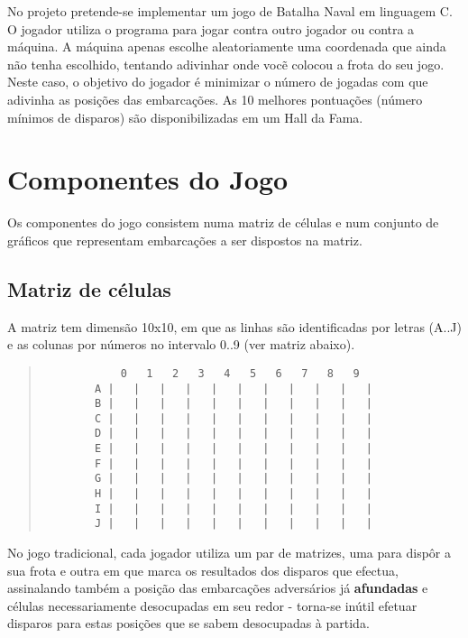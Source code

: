 \documentclass[defesa,oneside]{ppginf}
\begin{document}
No projeto pretende-se implementar um jogo de Batalha Naval em linguagem C. O jogador utiliza o programa para jogar contra outro jogador ou contra a máquina. A máquina apenas escolhe aleatoriamente uma coordenada que ainda não tenha escolhido, tentando adivinhar onde vocẽ colocou a frota do seu jogo. Neste caso, o objetivo do jogador é minimizar o número de jogadas com que adivinha as posições das embarcações. As 10 melhores pontuações (número mínimos de disparos) são disponibilizadas em um Hall da Fama.


\chapter{Componentes do Jogo}

Os componentes do jogo consistem numa matriz de células e num conjunto de gráficos que representam embarcações a ser dispostos na matriz.

\section{Matriz de células}

A matriz tem dimensão 10x10, em que as linhas são identificadas por letras (A..J) e as colunas por números no intervalo 0..9 (ver matriz abaixo).

\begin{quote}
	\begin{footnotesize}
		\begin{verbatim}
		    0   1   2   3   4   5   6   7   8   9
		A |   |   |   |   |   |   |   |   |   |   |
		B |   |   |   |   |   |   |   |   |   |   |
		C |   |   |   |   |   |   |   |   |   |   |
		D |   |   |   |   |   |   |   |   |   |   |
		E |   |   |   |   |   |   |   |   |   |   |
		F |   |   |   |   |   |   |   |   |   |   |
		G |   |   |   |   |   |   |   |   |   |   |
		H |   |   |   |   |   |   |   |   |   |   |
		I |   |   |   |   |   |   |   |   |   |   |
		J |   |   |   |   |   |   |   |   |   |   |
		\end{verbatim}		
	\end{footnotesize}
\end{quote}

No jogo tradicional, cada jogador utiliza um par de matrizes, uma para dispôr a sua frota e outra em que marca os resultados dos disparos que efectua, assinalando também a posição das embarcações adversários já \textbf{afundadas} e células necessariamente desocupadas em seu redor - torna-se inútil efetuar disparos para estas posições que se sabem desocupadas à partida.
\end{document}
